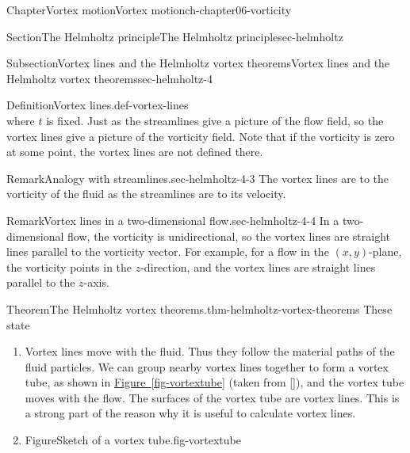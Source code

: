\documentclass[oneside,10pt,]{book}
\newcommand{\xreffont}{\relax}
\numberwithin{equation}{section}
\begin{document}
\begin{chapterptx}{Chapter}{Vortex motion}{}{Vortex motion}{}{}{ch-chapter06-vorticity}
\begin{sectionptx}{Section}{The Helmholtz principle}{}{The Helmholtz principle}{}{}{sec-helmholtz}
\begin{subsectionptx}{Subsection}{Vortex lines and the Helmholtz vortex theorems}{}{Vortex lines and the Helmholtz vortex theorems}{}{}{sec-helmholtz-4}
\begin{definition}{Definition}{Vortex lines.}{def-vortex-lines}
\begin{equation*}
\end{equation*}
where \(t\) is fixed. Just as the streamlines give a picture of the flow field, so the vortex lines give a picture of the vorticity field. Note that if the vorticity is zero at some point, the vortex lines are not defined there.%
\end{definition}
\begin{remark}{Remark}{Analogy with streamlines.}{sec-helmholtz-4-3}%
The vortex lines are to the vorticity of the fluid as the streamlines are to its velocity.%
\end{remark}
\begin{remark}{Remark}{Vortex lines in a two-dimensional flow.}{sec-helmholtz-4-4}%
In a two-dimensional flow, the vorticity is unidirectional, so the vortex lines are straight lines parallel to the vorticity vector. For example, for a flow in the \((x,y)\)-plane, the vorticity points in the \(z\)-direction, and the vortex lines are straight lines parallel to the \(z\)-axis.%
\end{remark}
\begin{theorem}{Theorem}{The Helmholtz vortex theorems.}{}{thm-helmholtz-vortex-theorems}%
These state%
\begin{enumerate}
\item{}Vortex lines move with the fluid. Thus they follow the material paths of the fluid particles. We can group nearby vortex lines together to form a vortex tube, as shown in \hyperref[fig-vortextube]{Figure~{\xreffont\ref{fig-vortextube}}} (taken from \hyperlink{ref-acheson}{[{\xreffont 4}]}), and the vortex tube moves with the flow. The surfaces of the vortex tube are vortex lines. This is a strong part of the reason why it is useful to calculate vortex lines.%
\item{}\begin{figureptx}{Figure}{Sketch of a vortex tube.}{fig-vortextube}{}%
\begin{image}{0.25}{0.5}{0.25}{}%

\end{image}
\end{figureptx}
\end{enumerate}
\end{theorem}
\end{subsectionptx}
\end{sectionptx}
\end{chapterptx}
\end{document}
